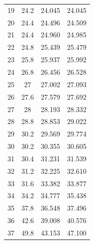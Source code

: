 \begin{table}[H]
\begin{tabular}{cccc}
    19        & 24.2             & 24.045         & 24.045         \\
    20        & 24.4             & 24.496         & 24.509         \\
    21        & 24.4             & 24.960         & 24.985         \\
    22        & 24.8             & 25.439         & 25.479         \\
    23        & 25.8             & 25.937         & 25.992         \\
    24        & 26.8             & 26.456         & 26.528         \\
    25        & 27               & 27.002         & 27.093         \\
    26        & 27.6             & 27.579         & 27.692         \\
    27        & 28               & 28.193         & 28.332         \\
    28        & 28.8             & 28.853         & 29.022         \\
    29        & 30.2             & 29.569         & 29.774         \\
    30        & 30.2             & 30.355         & 30.605         \\
    31        & 30.4             & 31.231         & 31.539         \\
    32        & 31.2             & 32.225         & 32.610         \\
    33        & 31.6             & 33.382         & 33.877         \\
    34        & 34.2             & 34.777         & 35.438         \\
    35        & 37.8             & 36.548         & 37.496         \\
    36        & 42.6             & 39.008         & 40.576         \\
    37        & 49.8             & 43.153         & 47.100         \\
    \bottomrule
    \end{tabular}
    \end{table}

